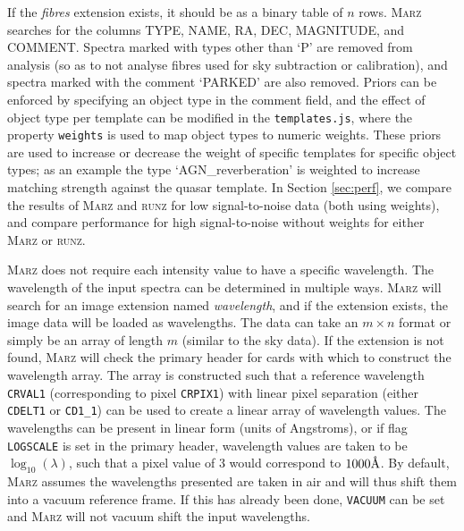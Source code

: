 \documentclass[5p]{elsarticle}
\newcommand{\runz}{\textsc{runz}}
\newcommand{\marz}{\textsc{Marz}}
\newcommand{\angstrom}{\mbox{\normalfont\AA}}
\begin{document}
If the \textit{fibres} extension exists, it should be as a binary table of $n$ rows. \marz{} searches for the columns TYPE, NAME, RA, DEC, MAGNITUDE, and COMMENT. Spectra marked with types other than `P' are removed from analysis (so as to not analyse fibres used for sky subtraction or calibration), and spectra marked with the comment `PARKED' are also removed. Priors can be enforced by specifying an object type in the comment field, and the effect of object type per template can be modified in the \verb;templates.js;, where the property \verb;weights; is used to map object types to numeric weights. These priors are used to increase or decrease the weight of specific templates for specific object types; as an example the type `AGN\_reverberation' is weighted to increase matching strength against the quasar template. In Section \ref{sec:perf}, we compare the results of \marz{} and \runz{} for low signal-to-noise data (both using weights), and compare performance for high signal-to-noise without weights for either \marz{} or \runz{}.


\marz{} does not require each intensity value to have a specific wavelength. The wavelength of the input spectra can be determined in multiple ways. \marz{} will search for an image extension named \textit{wavelength}, and if the extension exists, the image data will be loaded as wavelengths. The data can take an $m\times n$ format or simply be an array of length $m$ (similar to the sky data). If the extension is not found, \marz{} will check the primary header for cards with which to construct the wavelength array. The array is constructed such that a reference wavelength \verb;CRVAL1; (corresponding to pixel \verb;CRPIX1;) with linear pixel separation (either \verb;CDELT1; or \verb;CD1_1;) can be used to create a linear array of wavelength values. The wavelengths can be present in linear form (units of Angstroms), or if flag \verb;LOGSCALE; is set in the primary header, wavelength values are taken to be $\log_{10}(\lambda)$, such that a pixel value of $3$ would correspond to $1000\angstrom$. By default, \marz{} assumes the wavelengths presented are taken in air and will thus shift them into a vacuum reference frame. If this has already been done, \verb;VACUUM; can be set and \marz{} will not vacuum shift the input wavelengths.\\
\end{document}
